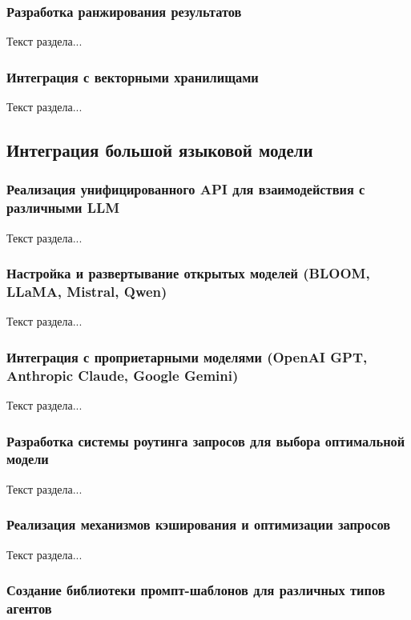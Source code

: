 \subsubsection{Разработка ранжирования результатов}

Текст раздела...

\subsubsection{Интеграция с векторными хранилищами}

Текст раздела...

\subsection{Интеграция большой языковой модели}

\subsubsection{Реализация унифицированного API для взаимодействия с различными LLM}

Текст раздела...

\subsubsection{Настройка и развертывание открытых моделей (BLOOM, LLaMA, Mistral, Qwen)}

Текст раздела...

\subsubsection{Интеграция с проприетарными моделями (OpenAI GPT, Anthropic Claude, Google Gemini)}

Текст раздела...

\subsubsection{Разработка системы роутинга запросов для выбора оптимальной модели}

Текст раздела...

\subsubsection{Реализация механизмов кэширования и оптимизации запросов}

Текст раздела...

\subsubsection{Создание библиотеки промпт-шаблонов для различных типов агентов}


